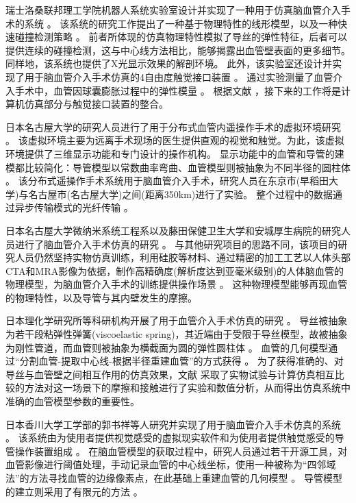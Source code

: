瑞士洛桑联邦理工学院机器人系统实验室设计并实现了一种用于仿真脑血管介入手术的系统 \cite{Wang2007EPFL,Ilic2005EPFL,Moix2005EPFL,Ilic2005aEPFL,Ilic2005bEPFL}。
该系统的研究工作提出了一种基于物理特性的线形模型，以及一种快速碰撞检测策略 \cite{Wang2007EPFL}。
前者所体现的仿真物理特性模拟了导丝的弹性特征，后者可以提供连续的碰撞检测，这与中心线方法相比，能够揭露出血管壁表面的更多细节。
同样地，该系统也提供了X光显示效果的解剖环境。
此外，该实验室还设计并实现了用于脑血管介入手术仿真的4自由度触觉接口装置 \cite{Ilic2005EPFL,Moix2005EPFL,Ilic2005aEPFL}。
通过实验测量了血管介入手术中，血管因球囊膨胀过程中的弹性模量 \cite{Ilic2005bEPFL}。
根据文献 \cite{Wang2007EPFL}，接下来的工作将是计算机仿真部分与触觉接口装置的整合。

日本名古屋大学的研究人员进行了用于分布式血管内遥操作手术的虚拟环境研究 \cite{Arai1994Nagoya,Arai1995Nagoya,Arai1996Nagoya}。
该虚拟环境主要为远离手术现场的医生提供直观的视觉和触觉。为此，该虚拟环境提供了三维显示功能和专门设计的操作机构。
显示功能中的血管和导管的建模都比较简化：导管模型以常数曲率弯曲、血管模型则被抽象为不同半径的圆柱体 \cite{Arai1994Nagoya,Arai1995Nagoya}。
该分布式遥操作手术系统用于脑血管介入手术，研究人员在东京市(早稻田大学)与名古屋市(名古屋大学)之间(距离350km)进行了实验。
整个过程中的数据通过异步传输模式的光纤传输 \cite{Arai1996Nagoya}。

日本名古屋大学微纳米系统工程系以及藤田保健卫生大学和安城厚生病院的研究人员进行了脑血管介入手术仿真的研究 \cite{Ikeda2004Nagoya,Ikeda2005Nagoya,Ikeda2005aNagoya,Ikeda2006Nagoya,Ikeda2007Nagoya}。%
与其他研究项目的思路不同，该项目的研究人员仍然坚持实物仿真训练，利用硅胶等材料、通过精密的加工工艺以人体头部CTA和MRA影像为依据，制作高精确度(解析度达到亚毫米级别)的人体脑血管的物理模型，为脑血管介入手术的训练提供操作场景 \cite{Ikeda2005Nagoya}。%
这种物理模型能够再现血管的物理特性，以及导管与其内壁发生的摩擦。

日本理化学研究所等科研机构开展了用于血管介入手术仿真的研究 \cite{takashima2009RIKEN,takashima2007RIKEN}。
导丝被抽象为若干段粘弹性弹簧(viscoelastic spring)，其近端由于受限于导丝模型，故被抽象为刚性管道，而血管则被抽象为横截面为圆的弹性圆柱体 \cite{takashima2009RIKEN}。
血管的几何模型通过“分割血管-提取中心线-根据半径重建血管”的方式获得 \cite{takashima2009RIKEN}。
为了获得准确的、对导丝与血管壁之间相互作用的仿真效果，文献 \cite{takashima2007RIKEN}采取了实物试验与计算仿真相互比较的方法对这一场景下的摩擦和接触进行了实验和数值分析，从而得出仿真系统中准确的血管模型参数的重要性。%

日本香川大学工学部的郭书祥等人研究并实现了用于脑血管介入手术仿真的系统 \cite{Gao2012aGUO,Gao2012bGUO,Gao2012cGUO}。
该系统由为使用者提供视觉感受的虚拟现实软件和为使用者提供触觉感受的导管操作装置组成 \cite{Gao2012aGUO}。
在脑血管模型的获取过程中，研究人员通过若干开源工具，对血管影像进行阈值处理，手动记录血管的中心线坐标，使用一种被称为“四邻域法”的方法寻找血管的边缘像素点，在此基础上重建血管的几何模型 \cite{Gao2012bGUO}。%
导管模型的建立则采用了有限元的方法 \cite{Gao2012cGUO}。

